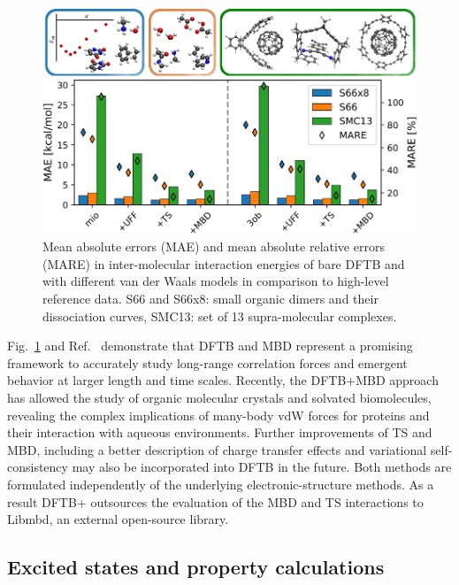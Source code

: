 \documentclass{revtex4-1}
\newcommand{\dftbp}{DFTB+}
\begin{document}
\begin{figure}[htbp]
  \centering
  \includegraphics[scale=1.]{figures/DFTBvdW_benchmark_MAEs.pdf}
  \caption{\label{fig:dftbvdw_benchmarks} Mean absolute errors (MAE) and mean
    absolute relative errors (MARE) in inter-molecular interaction energies of
    bare DFTB and with different van der Waals models in comparison to
    high-level reference data. S66 and S66x8: small organic dimers and their
    dissociation curves,\cite{Rezac2011_S66,Rezac2011_S66x8} SMC13: set of 13
    supra-molecular
    complexes.\cite{Ambrosetti2014_JPCL,Hermann2017,Stoehr2019_CSR}}
\end{figure}
%
Fig.~\ref{fig:dftbvdw_benchmarks} and Ref.~ demonstrate
that DFTB and MBD represent a promising framework to accurately study long-range
correlation forces and emergent behavior at larger length and time
scales. Recently, the DFTB+MBD approach has allowed the study of organic
molecular crystals\cite{mortazavi2018} and solvated biomolecules, revealing the
complex implications of many-body vdW forces for proteins and their interaction
with aqueous environments.\cite{Stoehr2019} Further improvements of TS and MBD,
including a better description of charge transfer effects\cite{Gould2016} and
variational self-consistency\cite{Ferri2015} may also be incorporated into DFTB
in the future.  Both methods are formulated independently of the underlying
electronic-structure methods. As a result \dftbp{} outsources the evaluation of
the MBD and TS interactions to Libmbd,\cite{libmbd} an external open-source
library.


\subsection{Excited states and property calculations}
\end{document}
